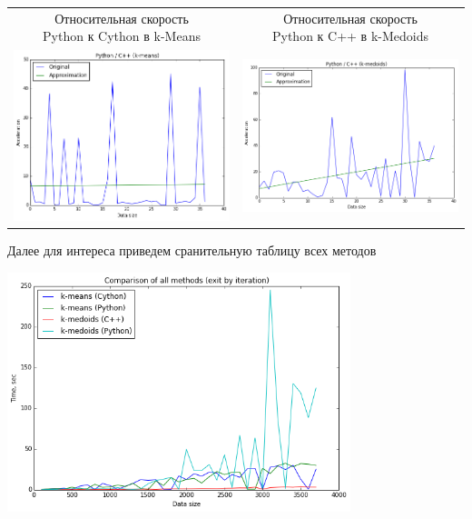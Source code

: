 \documentclass[12pt, a4paper]{article}
\begin{document}
			\begin{center}
			\begin{tabular}{c c}
				\pbox{8cm}{Относительная скорость \\ Python к Cython в k-Means} &
				\pbox{8cm}{Относительная скорость \\ Python к C++ в k-Medoids} \\

				\includegraphics[width=8cm]{python_by_cpp_kmeans.png} &
				\includegraphics[width=8cm]{python_by_cpp_kmedoids.png} \\
			\end{tabular}
			\end{center}

			Далее для интереса приведем сранительную таблицу всех методов
			\begin{center}
				\includegraphics[width=10cm]{python_all_comparison.png}
			\end{center}
\end{document}
